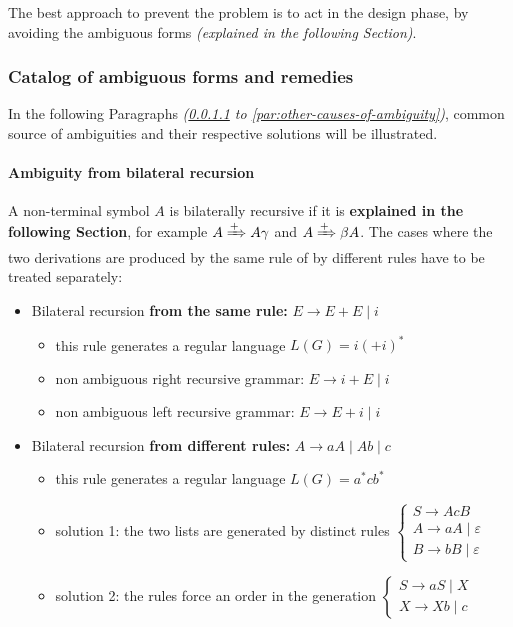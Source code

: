 \documentclass[english]{article}
\begin{document}
The best approach to prevent the problem is to act in the design phase, by avoiding the ambiguous forms \textit{(explained in the following Section)}.

\subsubsection{Catalog of ambiguous forms and remedies}

In the following Paragraphs \textit{(\ref{par:ambiguity-from-bilateral-recursion} to \ref{par:other-causes-of-ambiguity})}, common source of ambiguities and their respective solutions will be illustrated.

\paragraph{Ambiguity from bilateral recursion}
\label{par:ambiguity-from-bilateral-recursion}

A non-terminal symbol \(A\) is bilaterally recursive if it is \textbf{explained in the following Section}, for example \(A \xRightarrow{+} A \gamma\) and \(A \xRightarrow{+} \beta A\).
The cases where the two derivations are produced by the same rule of by different rules have to be treated separately:

\begin{itemize}
  \item Bilateral recursion \textbf{from the same rule:} \(E \rightarrow E + E \mid i\)
        \begin{itemize}
          \item this rule generates a regular language \(L(G) = i (+i)^\ast\)
          \item non ambiguous right recursive grammar: \(E \rightarrow i + E \mid i\)
          \item non ambiguous left recursive grammar: \(E \rightarrow E + i \mid i\)
        \end{itemize}
  \item Bilateral recursion \textbf{from different rules:} \(A \rightarrow aA \mid Ab \mid c\)
        \begin{itemize}
          \item this rule generates a regular language \(L(G) = a^\ast c b^\ast\)
          \item solution 1: the two lists are generated by distinct rules
                \(\begin{cases}
                  S  \rightarrow AcB                 \\
                  A  \rightarrow aA \mid \varepsilon \\
                  B  \rightarrow bB \mid \varepsilon
                \end{cases}\)
          \item solution 2: the rules force an order in the generation
                \(\begin{cases}
                  S \rightarrow aS \mid X \\
                  X \rightarrow Xb \mid c
                \end{cases}\)
        \end{itemize}
\end{itemize}
\end{document}

